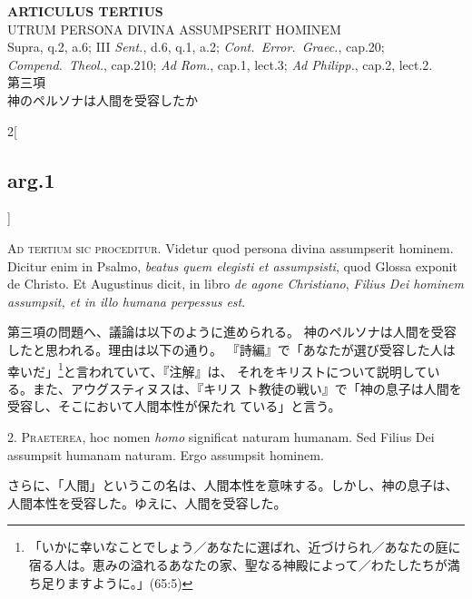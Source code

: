 \documentclass[paper=a4paper,fontsize=10pt,jafontsize=9pt,titlepage]{jlreq}
\begin{document}
{}
\setcounter{section}{3}
\setcounter{subsection}{0}
\begin{center}
 {\Large {\bfseries ARTICULUS TERTIUS}}\\
 {\large UTRUM PERSONA DIVINA ASSUMPSERIT HOMINEM}\\
 {\footnotesize Supra, q.2, a.6; III {\itshape Sent.}, d.6, q.1, a.2;
 {\itshape Cont.~Error.~Graec.}, cap.20; {\itshape Compend.~Theol.},
 cap.210; {\itshape Ad Rom.}, cap.1, lect.3; {\itshape Ad Philipp.},
 cap.2, lect.2.}\\
 {\Large 第三項\\神のペルソナは人間を受容したか}
\end{center}

\begin{paracol}{2}[\subsection{arg.1}]

{\Huge A}{\scshape d tertium sic proceditur}. Videtur quod persona divina assumpserit
hominem. Dicitur enim in Psalmo, {\itshape beatus quem elegisti et assumpsisti},
quod Glossa exponit de Christo. Et Augustinus dicit, in libro {\itshape de agone
Christiano}, {\itshape Filius Dei hominem assumpsit, et in illo humana perpessus
est}.

\switchcolumn

第三項の問題へ、議論は以下のように進められる。
神のペルソナは人間を受容したと思われる。理由は以下の通り。
『詩編』で「あなたが選び受容した人は幸いだ」\footnote{「いかに幸いなことでしょう／あなたに選ばれ、近づけられ／あなたの庭に宿る人は。恵みの溢れるあなたの家、聖なる神殿によって／わたしたちが満ち足りますように。」(65:5)}と言われていて、『注解』は、
 それをキリストについて説明している。また、アウグスティヌスは、『キリス
 ト教徒の戦い』で「神の息子は人間を受容し、そこにおいて人間本性が保たれ
 ている」と言う。


2. {\scshape Praeterea}, hoc nomen {\itshape homo} significat naturam humanam. Sed Filius Dei
assumpsit humanam naturam. Ergo assumpsit hominem.

\switchcolumn

さらに、「人間」というこの名は、人間本性を意味する。しかし、神の息子は、
 人間本性を受容した。ゆえに、人間を受容した。


\end{paracol}
\end{document}
